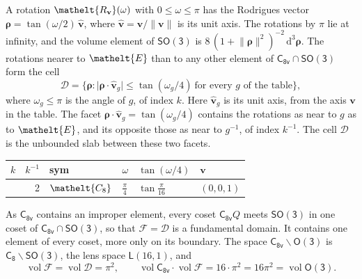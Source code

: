 \documentclass[10pt,a4paper]{article}
\numberwithin{equation}{section}
\newcommand{\eltfont}[1]{{\let\sigma\eltsigma\mathelt{#1}}}
\newcommand{\grp}[1]{\mathsf{#1}}
\newcommand{\cls}[1]{\eltfont{#1}}
\newcommand{\elt}[1]{\eltfont{#1}}
\newcommand{\dirvec}[3]{(#1, #2, #3)}
\newcommand{\unitaxis}{\hat{\mathbf{v}}}
\newcommand{\vv}{\mathbf{v}}
\newcommand{\diff}{\mathrm{d}}
\newcommand{\vol}{\operatorname{vol}}
\newcommand{\rodrigues}{\boldsymbol{\rho}}
\newcommand{\fcell}{\mathcal{D}}
\newcommand{\fdomain}{\mathcal{F}}
\newcommand{\lensspace}[2]{\mathsf{L}(#1, #2)}
\begin{document}
\leavevmode\label{n:vector.rodrigues}\label{n:vector.unitaxis}A rotation $\elt{R_{\vv}}(\omega)$ with $0 \le \omega \le \pi$ has the Rodrigues vector $\rodrigues = \tan(\omega/2)\,\unitaxis$, where $\unitaxis = \vv/\lVert\vv\rVert$ is its unit axis. The rotations by $\pi$ lie at infinity, and the volume element of \href{SO3.pdf}{$\grp{SO(3)}$} is $8\,(1 + \lVert\rodrigues\rVert^2)^{-2}\,\diff^3\rodrigues$.
\leavevmode\label{n:set.cell}The rotations nearer to $\elt{E}$ than to any other element of $\grp{C_{8v}} \cap \grp{SO(3)}$ form the cell
\begin{equation}\label{e:cell}\fcell = \bigl\{\rodrigues : \lvert\rodrigues\cdot\unitaxis_g\rvert \le \tan(\omega_g/4)\ \text{for every $g$ of the table}\bigr\},\end{equation}
where $\omega_g \le \pi$ is the angle of $g$, of index $k$. Here $\unitaxis_g$ is its unit axis, from the axis $\vv$ in the table. The facet $\rodrigues\cdot\unitaxis_g = \tan(\omega_g/4)$ contains the rotations as near to $g$ as to $\elt{E}$, and its opposite those as near to $g^{-1}$, of index $k^{-1}$. The cell $\fcell$ is the unbounded slab between these two facets.
{\small{\renewcommand{\arraystretch}{1.3}\begin{longtable}{@{}rrllll@{}}\toprule
$k$ & $k^{-1}$ & sym & $\omega$ & $\tan(\omega/4)$ & $\vv$\\\midrule\endhead
\bottomrule\endfoot\endlastfoot
1 & 2 & $\cls{C_{8}}$ & $\tfrac{\pi}{4}$ & $\tan\tfrac{\pi}{16}$ & $\dirvec{0}{0}{1}$\\
\bottomrule\end{longtable}}}

\leavevmode\label{n:set.fundamental}As $\grp{C_{8v}}$ contains an improper element, every coset $\grp{C_{8v}}Q$ meets \href{SO3.pdf}{$\grp{SO(3)}$} in one coset of $\grp{C_{8v}} \cap \grp{SO(3)}$, so that $\fdomain = \fcell$ is a fundamental domain. It contains one element of every coset, more only on its boundary.
\leavevmode\label{n:set.lens}The space $\grp{C_{8v}}\backslash\grp{O(3)}$ is $\grp{C_{8}}\backslash\grp{SO(3)}$, the lens space $\lensspace{16}{1}$, and
\begin{equation}\label{e:volume}\vol\fdomain = \vol\fcell = \pi^2,\qquad \vol\grp{C_{8v}}\cdot\vol\fdomain = 16\cdot \pi^2 = 16\pi^2 = \vol\grp{O(3)}.\end{equation}
\end{document}
